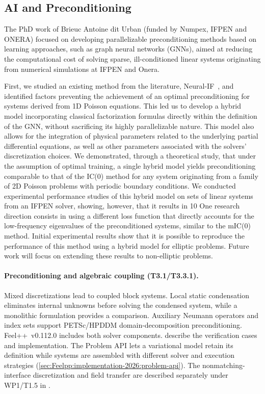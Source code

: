 
 
\subsection{ 
AI and Preconditioning 
 }

 The PhD work of Brieuc Antoine dit Urban (funded by Numpex, IFPEN and ONERA) focused on developing parallelizable preconditioning methods based on learning approaches, such as graph neural networks (GNNs), aimed at reducing the computational cost of solving sparse, ill-conditioned linear systems originating from numerical simulations at IFPEN and Onera.
 
 First, we studied an existing method from the literature, Neural-IF~\cite{hausner2023neural}, and identified factors preventing the achievement of an optimal preconditioning for systems derived from 1D Poisson equations. This led us to develop a hybrid model incorporating classical factorization formulas directly within the definition of the GNN, without sacrificing its highly parallelizable nature. This model also allows for the integration of physical parameters related to the underlying partial differential equations, as well as other parameters associated with the solvers' discretization choices.
 We demonstrated, through a theoretical study, that under the assumption of optimal training, a single hybrid model yields preconditioning comparable to that of the IC(0) method for any system originating from a family of 2D Poisson problems with periodic boundary conditions. We conducted experimental performance studies of this hybrid model on sets of linear systems from an IFPEN solver, showing, however, that it results in 10%
 One research direction consists in using a different loss function that directly accounts for the low-frequency eigenvalues of the preconditioned systems, similar to the mIC(0) method. Initial experimental results show that it is possible to reproduce the performance of this method using a hybrid model for elliptic problems. Future work will focus on extending these results to non-elliptic problems.


\paragraph{Preconditioning and algebraic coupling (T3.1/T3.3.1).}
Mixed discretizations lead to coupled block systems. Local static
condensation eliminates internal unknowns before solving the condensed
system, while a monolithic formulation provides a comparison. Auxiliary
Neumann operators and index sets support PETSc/HPDDM domain-decomposition
preconditioning. Feel++~v0.112.0 includes both solver components.
describe the verification cases and implementation. The Problem API
lets a variational model retain its definition while systems are
assembled with different solver and execution strategies
(\cref{sec:Feelpp:implementation-2026:problem-api}).
The nonmatching-interface discretization and field transfer are described
separately under WP1/T1.5 in .

